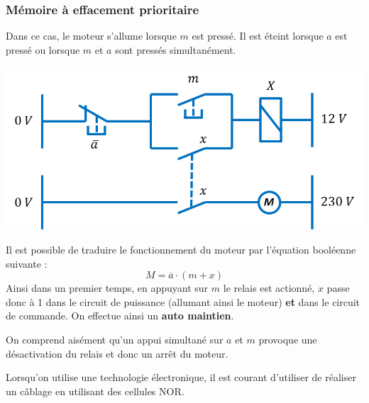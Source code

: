 \documentclass[10pt]{article}
\begin{document}
\subsubsection{Mémoire à effacement prioritaire}
Dans ce cas, le moteur s'allume lorsque $m$ est pressé. Il est éteint lorsque $a$ est pressé ou lorsque $m$ et $a$ sont pressés simultanément.
 
 
\begin{minipage}[c]{.5\linewidth}
\begin{center}
\includegraphics[width=\textwidth]{images/mem_eff}
\end{center}
\end{minipage} \hfill
\begin{minipage}[c]{.47\linewidth}
Il est possible de traduire le fonctionnement du moteur par l'équation booléenne suivante : 
$$
M = \overline{a} \cdot \left(m +  x \right)
$$
Ainsi dans un premier temps, en appuyant sur $m$ le relais est actionné, $x$ passe donc à 1 dans le circuit de puissance (allumant ainsi le moteur) \textbf{et} dans le circuit de commande. On effectue ainsi un \textbf{auto maintien}. 

On comprend aisément qu'un appui simultané sur $a$ et $m$ provoque une désactivation du relais et donc un arrêt du moteur. 
\end{minipage}

 Lorsqu'on utilise une technologie électronique, il est courant d'utiliser de réaliser un câblage en utilisant des cellules NOR. 

\vspace{.2cm}
\end{document}
